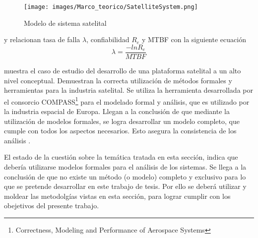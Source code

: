 \begin{figure}[h]
  \centering
  \texttt{[image: images/Marco\_teorico/SatelliteSystem.png]}
  \caption{Modelo de sistema satelital \citep{Hoque15}}  
  \label{fig:SystemSatellite} 
\end{figure}

\cite{Hoque15} y \cite{Peng13} relacionan tasa de falla $\lambda$, confiabilidad $R_e$ y \ac{MTBF} con la siguiente ecuación $$\lambda = \frac{-ln R_e}{MTBF}$$

\cite{Esteve12} muestra el caso de estudio del desarrollo de una plataforma satelital a un alto nivel conceptual. Demuestran la correcta utilización de métodos formales y herramientas para la industria satelital. Se utiliza la herramienta desarrollada por el consorcio COMPASS\footnote{Correctness, Modeling and Performance of Aerospace Systems} para el modelado formal y análisis, que es utilizado por la industria espacial de Europa. Llegan a la conclusión de que mediante la utilización de modelos formales, se logra desarrollar un modelo completo, que cumple con todos los aspectos necesarios. Esto asegura la consistencia de los análisis \citep{Esteve12}.

El estado de la cuestión sobre la temática tratada en esta sección, indica que debería utilizarse modelos formales para el análisis de los sistemas. Se llega a la conclusión de que no existe un método (o modelo) completo y exclusivo para lo que se pretende desarrollar en este trabajo de tesis. Por ello se deberá utilizar y moldear las metodolgías vistas en esta sección, para lograr cumplir con los obejetivos del presente trabajo. 


